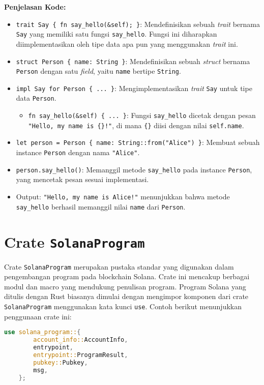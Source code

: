 \textbf{Penjelasan Kode:}
\begin{itemize}
	\item \texttt{trait Say \{ fn say\_hello(\&self); \}}: Mendefinisikan sebuah \textit{trait} bernama \texttt{Say} yang memiliki satu fungsi \texttt{say\_hello}. Fungsi ini diharapkan diimplementasikan oleh tipe data apa pun yang menggunakan \textit{trait} ini.
	\item \texttt{struct Person \{ name: String \}}: Mendefinisikan sebuah \textit{struct} bernama \texttt{Person} dengan satu \textit{field}, yaitu \texttt{name} bertipe \texttt{String}.
	\item \texttt{impl Say for Person \{ ... \}}: Mengimplementasikan \textit{trait} \texttt{Say} untuk tipe data \texttt{Person}.
	\begin{itemize}
		\item \texttt{fn say\_hello(\&self) \{ ... \}}: Fungsi \texttt{say\_hello} dicetak dengan pesan \texttt{"Hello, my name is \{\}!"}, di mana \texttt{\{\}} diisi dengan nilai \texttt{self.name}.
	\end{itemize}
	\item \texttt{let person = Person \{ name: String::from("Alice") \}}: Membuat sebuah instance \texttt{Person} dengan nama \texttt{"Alice"}.
	\item \texttt{person.say\_hello()}: Memanggil metode \texttt{say\_hello} pada instance \texttt{Person}, yang mencetak pesan sesuai implementasi.
	\item Output: \texttt{"Hello, my name is Alice!"} menunjukkan bahwa metode \texttt{say\_hello} berhasil memanggil nilai \texttt{name} dari \texttt{Person}.
\end{itemize}

\section{Crate \texttt{SolanaProgram}}

Crate \texttt{SolanaProgram} merupakan pustaka standar yang digunakan dalam pengembangan program pada blockchain Solana. Crate ini mencakup berbagai modul dan macro yang mendukung penulisan program. Program Solana yang ditulis dengan Rust biasanya dimulai dengan mengimpor komponen dari crate \texttt{SolanaProgram} menggunakan kata kunci \texttt{use}. Contoh berikut menunjukkan penggunaan crate ini:

\begin{lstlisting}[language=Rust, caption={Impor Komponen dari Crate SolanaProgram}]
	use solana_program::{
		account_info::AccountInfo,
		entrypoint,
		entrypoint::ProgramResult,
		pubkey::Pubkey,
		msg,
	};
\end{lstlisting}

